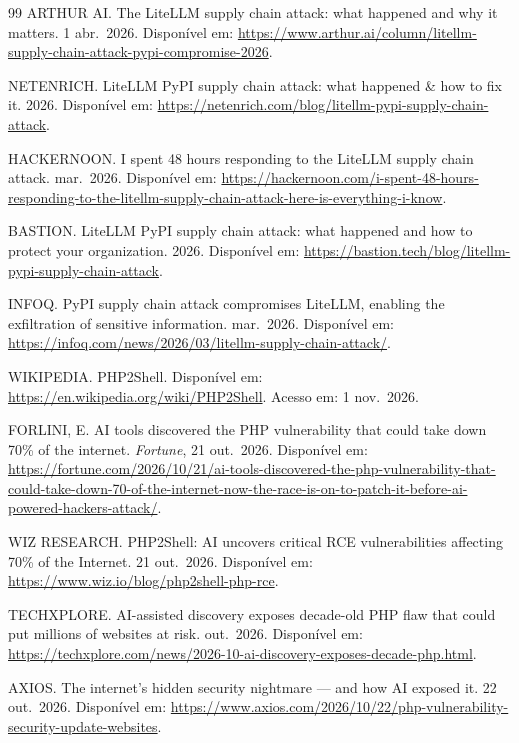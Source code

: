 \documentclass[12pt,a4paper]{article}
\begin{document}
\begin{thebibliography}{99}
ARTHUR AI. The LiteLLM supply chain attack: what happened and why it matters.
1 abr.\ 2026. Disponível em:
\url{https://www.arthur.ai/column/litellm-supply-chain-attack-pypi-compromise-2026}.

NETENRICH. LiteLLM PyPI supply chain attack: what happened \& how to fix it.
2026. Disponível em:
\url{https://netenrich.com/blog/litellm-pypi-supply-chain-attack}.

HACKERNOON. I spent 48 hours responding to the LiteLLM supply chain attack.
mar.\ 2026. Disponível em:
\url{https://hackernoon.com/i-spent-48-hours-responding-to-the-litellm-supply-chain-attack-here-is-everything-i-know}.

BASTION. LiteLLM PyPI supply chain attack: what happened and how to protect
your organization. 2026. Disponível em:
\url{https://bastion.tech/blog/litellm-pypi-supply-chain-attack}.

INFOQ. PyPI supply chain attack compromises LiteLLM, enabling the exfiltration
of sensitive information. mar.\ 2026. Disponível em:
\url{https://infoq.com/news/2026/03/litellm-supply-chain-attack/}.

WIKIPEDIA. PHP2Shell. Disponível em:
\url{https://en.wikipedia.org/wiki/PHP2Shell}. Acesso em: 1 nov.\ 2026.

FORLINI, E. AI tools discovered the PHP vulnerability that could take down 70\%
of the internet. \emph{Fortune}, 21 out.\ 2026. Disponível em:
\url{https://fortune.com/2026/10/21/ai-tools-discovered-the-php-vulnerability-that-could-take-down-70-of-the-internet-now-the-race-is-on-to-patch-it-before-ai-powered-hackers-attack/}.

WIZ RESEARCH. PHP2Shell: AI uncovers critical RCE vulnerabilities affecting 70\%
of the Internet. 21 out.\ 2026. Disponível em:
\url{https://www.wiz.io/blog/php2shell-php-rce}.

TECHXPLORE. AI-assisted discovery exposes decade-old PHP flaw that could put
millions of websites at risk. out.\ 2026. Disponível em:
\url{https://techxplore.com/news/2026-10-ai-discovery-exposes-decade-php.html}.

AXIOS. The internet's hidden security nightmare --- and how AI exposed it.
22 out.\ 2026. Disponível em:
\url{https://www.axios.com/2026/10/22/php-vulnerability-security-update-websites}.


\end{thebibliography}
\end{document}
